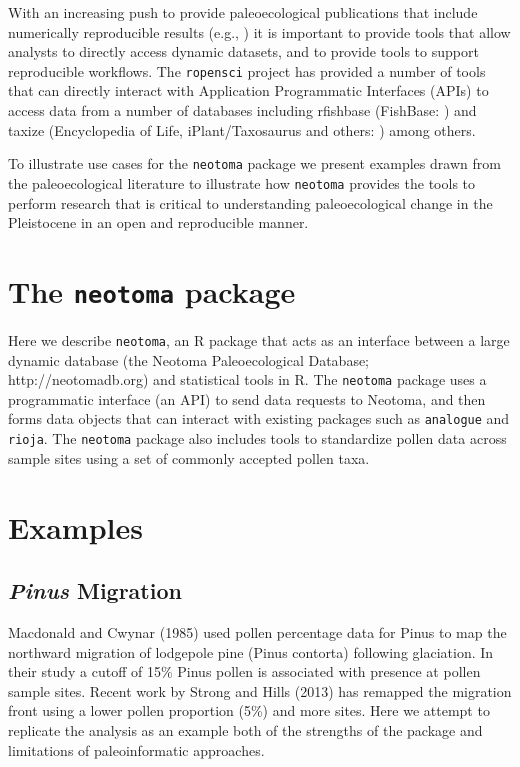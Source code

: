 \documentclass{article}
\begin{document}
With an increasing push to provide paleoecological publications that include numerically reproducible results (e.g., \cite{goring2012depo,gill2013linking,goring2013pollen}) it is important to provide tools that allow analysts to directly access dynamic datasets, and to provide tools to support reproducible workflows.  The \texttt{ropensci} project has provided a number of tools that can directly interact with Application Programmatic Interfaces (APIs) to access data from a number of databases including rfishbase (FishBase: \cite{boettiger2012rfishbase}) and taxize (Encyclopedia of Life, iPlant/Taxosaurus and others: \cite{chamberlain2013taxize}) among others.

To illustrate use cases for the \texttt{neotoma} package we present examples drawn from the paleoecological literature to illustrate how \texttt{neotoma} provides the tools to perform research that is critical to understanding paleoecological change in the Pleistocene in an open and reproducible manner.

\section*{The \texttt{neotoma} package}

Here we describe \texttt{neotoma}, an R package that acts as an interface between a large dynamic database (the Neotoma Paleoecological Database; http://neotomadb.org) and statistical tools in R.  The \texttt{neotoma} package uses a programmatic interface (an API) to send data requests to Neotoma, and then forms data objects that can interact with existing packages such as \texttt{analogue} and \texttt{rioja}.  The \texttt{neotoma} package also includes tools to standardize pollen data across sample sites using a set of commonly accepted pollen taxa.

\section*{Examples}
\subsection*{\emph{Pinus} Migration}
Macdonald and Cwynar (1985) used pollen percentage data for Pinus to map the northward migration of lodgepole pine (Pinus contorta) following glaciation.  In their study a cutoff of 15\% Pinus pollen is associated with presence at pollen sample sites.  Recent work by Strong and Hills (2013) has remapped the migration front using a lower pollen proportion (5\%) and more sites.  Here we attempt to replicate the analysis as an example both of the strengths of the package and limitations of paleoinformatic approaches.
\end{document}
